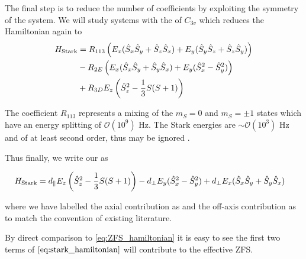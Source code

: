 The final step is to reduce the number of coefficients by exploiting the symmetry of the system. We will study systems with the  of $C_{3v}$ \cite{Davidsson2018} which reduces the Hamiltonian again to \cite{mims}
\begin{equation}
    \begin{align}
        H_{\ce{Stark}} &= R_{113}\left(E_x (\hat{S}_x\hat{S}_y + \hat{S}_z\hat{S}_x) + E_y(\hat{S}_y\hat{S}_z + \hat{S}_z\hat{S}_y) \right) \\ 
                       &- R_{2E} \left(E_x(\hat{S}_x\hat{S}_y + \hat{S}_y\hat{S}_x) + E_y(\hat{S}_x^2 - \hat{S}_y^2   )\right) \\ 
                       &+ R_{3D}E_z\left(\hat{S}_z^2 - \frac{1}{3} S(S+1)\right)
    \end{align}
    \label{eq:}
\end{equation}


The coefficient $R_{113}$ represents a mixing of the $m_S = 0$ and $m_S = \pm 1$ states which have an energy splitting of $\mathcal{O}(10^9)$ Hz. The Stark energies are $\sim \mathcal{O} (10^3)$ Hz and of at least second order, thus may be ignored \cite{VanOort1990}.  

Thus finally, we write our  as 

\begin{equation}
    \begin{align}
        H_{\ce{Stark}} &=
                        d_\parallel E_z\left(\hat{S}_z^2 - \frac{1}{3} S(S+1)\right)
        - d_\perp  E_y(\hat{S}_x^2 - \hat{S}_y^2   ) + d_\perp E_x(\hat{S}_x\hat{S}_y + \hat{S}_y\hat{S}_x)  
    \end{align}
    \label{eq:stark_hamiltonian}
\end{equation}

where we have labelled the axial contribution as  and the off-axis contribution as  to match the convention of existing literature. 

By direct comparison to \eqref{eq:ZFS_hamiltonian} it is easy to see the first two terms of $\eqref{eq:stark_hamiltonian}$ will contribute to the effective ZFS.  

